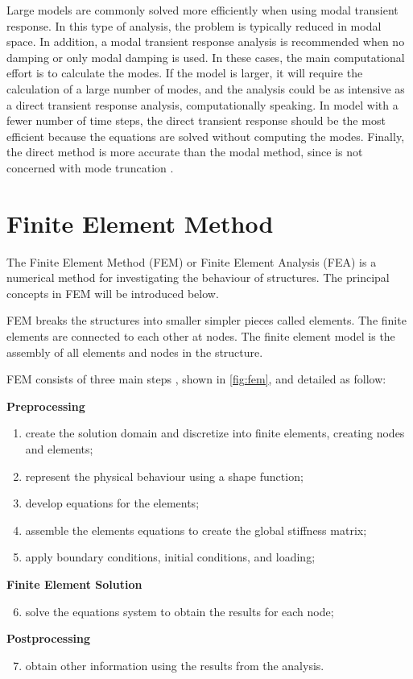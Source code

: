 Large models are commonly solved more efficiently when using modal transient response. In this type of analysis, the problem is typically reduced in modal space. In addition, a modal transient response analysis is recommended when no damping or only modal damping is used. In these cases, the main computational effort is to calculate the modes. If the model is larger, it will require the calculation of a large number of modes, and the analysis could be as intensive as a direct transient response analysis, computationally speaking. In model with a fewer number of time steps, the direct transient response should be the most efficient because the equations are solved without computing the modes. Finally, the direct method is more accurate than the modal method, since is not concerned with mode truncation \cite{nastran2004basic}.

\section{Finite Element Method}

The Finite Element Method (FEM) or Finite Element Analysis (FEA) is a numerical method for investigating the behaviour of structures. The principal concepts in FEM  \cite{logan2011first,felippa2004introduction} will be introduced below.

FEM breaks the structures into smaller simpler pieces called elements. The finite elements are connected to each other at nodes. The finite element model is the assembly of all elements and nodes in the structure.

FEM consists of three main steps \cite{moaveni2008finite}, shown in \autoref{fig:fem}, and detailed as follow:

\textbf{Preprocessing}
\vspace{0.5em}
\begin{enumerate}[label=(\roman*)]
\item create the solution domain and discretize into finite elements, creating nodes and elements;
\item represent the physical behaviour using a shape function;
\item develop equations for the elements;
\item assemble the elements equations to create the global stiffness matrix;
\item apply boundary conditions, initial conditions, and loading;
\end{enumerate}
\textbf{Finite Element Solution}
\vspace{0.5em}
\begin{enumerate}[label=(\roman*)]
\setcounter{enumi}{5}
\item solve the equations system to obtain the results for each node;
\end{enumerate}
\textbf{Postprocessing}
\vspace{0.5em}
\begin{enumerate}[label=(\roman*)]
\setcounter{enumi}{6}
\item obtain other information using the results from the analysis.
\end{enumerate}

